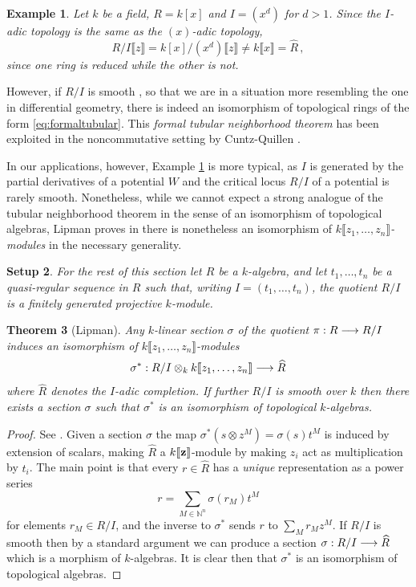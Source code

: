 \documentclass[english,letter paper,12pt,leqno]{article}
\newtheorem{theorem}{Theorem}[section]
\newtheorem{setup}[theorem]{Setup}
\theoremstyle{example}
\newtheorem{example}[theorem]{Example}
\numberwithin{equation}{section}
\def\be{\begin{equation}}
\def\ee{\end{equation}}
\begin{document}
\begin{example}\label{eq:example_nontub} Let $k$ be a field, $R = k[x]$ and $I = (x^d)$ for $d > 1$. Since the $I$-adic topology is the same as the $(x)$-adic topology, 
\[
R/I\llbracket z \rrbracket = k[x]/(x^d) \llbracket z \rrbracket \neq k\llbracket x \rrbracket = \widehat{R}\,,
\]
since one ring is reduced while the other is not.
\end{example}

However, if $R/I$ is smooth \cite[Definition 28.D]{matsumura}, so that we are in a situation more resembling the one in differential geometry, there is indeed an isomorphism of topological rings of the form \eqref{eq:formaltubular}. This \emph{formal tubular neighborhood theorem} has been exploited in the noncommutative setting by Cuntz-Quillen \cite[Theorem 2]{cuntzquillen}. 

In our applications, however, Example \ref{eq:example_nontub} is more typical, as $I$ is generated by the partial derivatives of a potential $W$ and the critical locus $R/I$ of a potential is rarely smooth. Nonetheless, while we cannot expect a strong analogue of the tubular neighborhood theorem in the sense of an isomorphism of topological algebras, Lipman proves in \cite{lipman} there is nonetheless an isomorphism of \textsl{$k\llbracket z_1,\ldots,z_n \rrbracket$-modules} in the necessary generality.

\begin{setup} For the rest of this section let $R$ be a $k$-algebra, and let $t_1,\ldots,t_n$ be a quasi-regular sequence in $R$ such that, writing $I = (t_1,\ldots,t_n)$, the quotient $R/I$ is a finitely generated projective $k$-module.
\end{setup}

\begin{theorem}[Lipman]\label{prop_algtube} Any $k$-linear section $\sigma$ of the quotient $\pi: R \longrightarrow R/I$ induces an isomorphism of $k\llbracket z_1,\ldots,z_n \rrbracket$-modules
\[
\sigma^*: R/I \otimes_k k\llbracket z_1,\ldots,z_n \rrbracket \longrightarrow \widehat{R}
\]
where $\widehat{R}$ denotes the $I$-adic completion. If further $R/I$ is smooth over $k$ then there exists a section $\sigma$ such that $\sigma^*$ is an isomorphism of topological $k$-algebras.
\end{theorem}
\begin{proof}
See \cite{??}. Given a section $\sigma$ the map $\sigma^*(s \otimes z^M) = \sigma(s) t^M$ is induced by extension of scalars, making $\widehat{R}$ a $k\llbracket \bold{z} \rrbracket$-module by making $z_i$ act as multiplication by $t_i$. The main point is that every $r \in \widehat{R}$ has a \emph{unique} representation as a power series
\be\label{eq:uniq_decompr}
r = \sum_{M \in \mathbb{N}^n} \sigma(r_M) t^M
\ee
for elements $r_M \in R/I$, and the inverse to $\sigma^*$ sends $r$ to $\sum_M r_M z^M$. If $R/I$ is smooth then by a standard argument \cite{matsumura} we can produce a section $\sigma: R/I \longrightarrow \widehat{R}$ which is a morphism of $k$-algebras. It is clear then that $\sigma^*$ is an isomorphism of topological algebras.
\end{proof}
\end{document}
